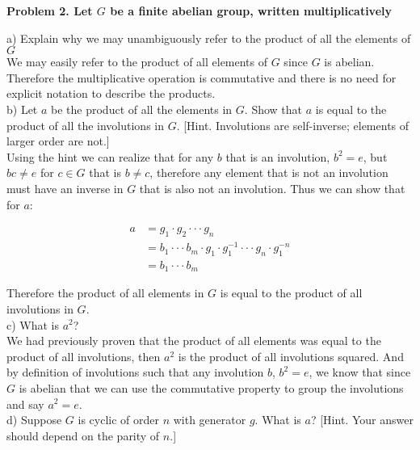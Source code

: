 \documentclass[20pt]{article}
\begin{document}
\noindent
\textbf{Problem 2. Let $G$ be a finite abelian group, written multiplicatively}\\
\begin{text}
    \noindent
    a) Explain why we may unambiguously refer to the product of all the elements of $G$\\
    
    We may easily refer to the product of all elements of $G$ since $G$ is abelian. Therefore the multiplicative operation is commutative and there is no need for explicit notation to describe the products.\\
    
    \noindent
    b) Let $a$ be the product of all the elements in $G$. Show that $a$ is equal to the product of all the involutions in $G$. [Hint. Involutions are self-inverse; elements of larger order are not.]\\
    
    Using the hint we can realize that for any $b$ that is an involution, $b^2 = e$, but $bc \neq e$ for $c \in G$ that is $b \neq c$, therefore any element that is not an involution must have an inverse in $G$ that is also not an involution. Thus we can show that for $a$:
    
    \begin{align}
        a &= g_1 \cdot g_2 \cdot \cdot \cdot g_n\nonumber\\
        &= b_1 \cdot \cdot \cdot b_m \cdot g_1 \cdot g_1^{-1} \cdot \cdot \cdot g_n \cdot g_1^{-n}\nonumber\tag{Since we have shown each inverse is in $G$}\\
        &= b_1 \cdot \cdot \cdot b_m\nonumber
    \end{align}
    
    Therefore the product of all elements in $G$ is equal to the product of all involutions in $G$.\\
    
    \noindent
    c) What is $a^2$?\\
    
    We had previously proven that the product of all elements was equal to the product of all involutions, then $a^2$ is the product of all involutions squared. And by definition of involutions such that any involution $b$, $b^2 = e$, we know that since $G$ is abelian that we can use the commutative property to group the involutions and say $a^2 = e$.\\
    
    \noindent
    d) Suppose $G$ is cyclic of order $n$ with generator $g$. What is $a$? [Hint. Your answer should depend on the parity of $n$.]\\
    

\end{text}
\end{document}
